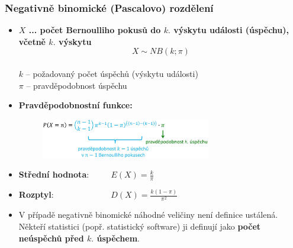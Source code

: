 \subsubsection{Negativně binomické (Pascalovo) rozdělení}
\begin{itemize}
	\item \textbf{$X$ ... počet Bernoulliho pokusů do $k.$ výskytu události (úspěchu), včetně $k.$ výskytu} 
	$$X \sim NB(k;\pi)$$ \\ $k$ -- požadovaný počet úspěchů (výskytu události) \\ $\pi$ -- pravděpodobnost úspěchu
	\item \textbf{Pravděpodobnostní funkce:}
	\begin{figure}[H]
	\centering
	\includegraphics[width=0.7\textwidth]{assets/12_neg_binom}
	\end{figure}
	\item \textbf{Střední hodnota}: $\qquad$ $E(X) = \frac{k}{\pi}$
	\item \textbf{Rozptyl}: $\qquad\qquad\qquad\;\; D(X) = \frac{k(1- \pi)}{\pi^2}$
	\item V případě negativně binomické náhodné veličiny není definice ustálená. Někteří statistici (popř. statistický software) ji definují jako \textbf{počet neúspěchů před $k.$ úspěchem}.
\end{itemize}

